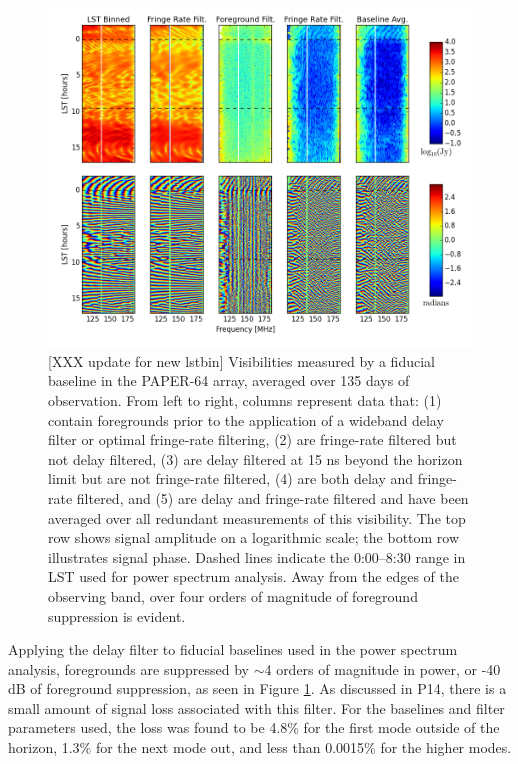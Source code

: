 \documentclass[twocolumn,numberedappendix]{emulateapj} \shorttitle{PSA64}
\begin{document}
\begin{figure}
\centering
\includegraphics[width=2\columnwidth]{plots/waterfalls_labeled.png}
\caption{
[XXX update for new lstbin]
Visibilities measured by a fiducial baseline in the PAPER-64 array, 
averaged over 135 days of observation.  From left to right, columns represent
data that: (1) contain foregrounds prior to the application of a wideband
delay filter or optimal fringe-rate filtering, (2) are fringe-rate filtered but
not delay filtered, (3) are delay filtered at 15 ns beyond the horizon limit but
are not fringe-rate filtered, (4) are both delay and fringe-rate filtered,
and (5) are delay and fringe-rate filtered and have been averaged over all
redundant measurements of this visibility.  The top row shows signal amplitude
on a logarithmic scale; the bottom row illustrates signal phase.
Dashed lines indicate the 0:00--8:30 range in LST used for power
spectrum analysis.  Away from the edges of the observing band, over four orders 
of magnitude of foreground suppression is evident.
} \label{fig:waterfalls}
\end{figure}

Applying the delay filter to fiducial baselines used in the power spectrum analysis,
foregrounds are suppressed by $\sim$4 orders of magnitude in power, or
 -40 dB of foreground suppression, as seen in Figure
\ref{fig:waterfalls}. As discussed in P14, there is a small amount of signal loss
associated with this filter. For the baselines and filter parameters used, the loss was found to be 4.8\% for the
first mode outside of the horizon, 1.3\% for the next mode out, and less than
0.0015\% for the higher modes.  
\end{document}
